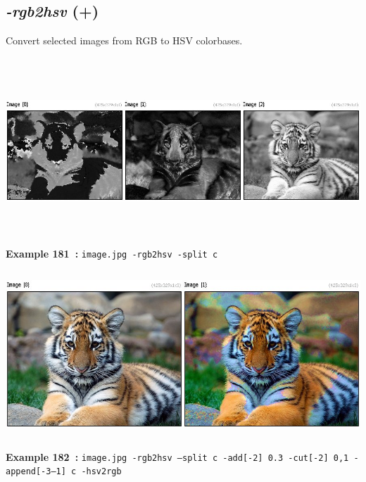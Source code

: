 \documentclass[a4paper,11pt,twoside]{book}
\begin{document}
\subsection{\emph{-rgb2hsv} (+)}\vspace*{-0.5em}
Convert selected images from RGB to HSV colorbases.
\begin{center}\includegraphics[keepaspectratio=true,height=7cm,width=\textwidth]{img/gmic_def181.jpg}\\
{\footnotesize \textbf{Example 181~:} \texttt{image.jpg -rgb2hsv -split c}}
\\\includegraphics[keepaspectratio=true,height=7cm,width=\textwidth]{img/gmic_def182.jpg}\\
{\footnotesize \textbf{Example 182~:} \texttt{image.jpg -rgb2hsv --split c -add[-2] 0.3 -cut[-2] 0,1 -append[-3--1] c -hsv2rgb}}
\end{center}
\end{document}
